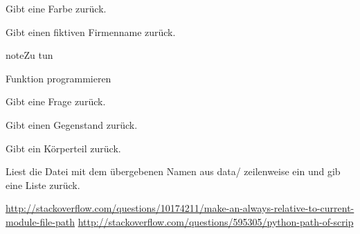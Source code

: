 \documentclass[a4paper,12pt,oneside]{sphinxmanual}
\begin{document}

\begin{fulllineitems}
\label{funktionen:pyzufall.farbe}
Gibt eine Farbe zurück.

\end{fulllineitems}


\begin{fulllineitems}
\label{funktionen:pyzufall.firma}
Gibt einen fiktiven Firmenname zurück.

\begin{notice}{note}{Zu tun}

Funktion programmieren
\end{notice}

\end{fulllineitems}


\begin{fulllineitems}
\label{funktionen:pyzufall.frage}
Gibt eine Frage zurück.

\end{fulllineitems}


\begin{fulllineitems}
\label{funktionen:pyzufall.gegenstand}
Gibt einen Gegenstand zurück.

\end{fulllineitems}


\begin{fulllineitems}
\label{funktionen:pyzufall.koerperteil}
Gibt ein Körperteil zurück.

\end{fulllineitems}


\begin{fulllineitems}
\label{funktionen:pyzufall.lese}
Liest die Datei mit dem übergebenen Namen aus data/ zeilenweise ein und gib eine Liste zurück.

\href{http://stackoverflow.com/questions/10174211/make-an-always-relative-to-current-module-file-path}{http://stackoverflow.com/questions/10174211/make-an-always-relative-to-current-module-file-path}
\href{http://stackoverflow.com/questions/595305/python-path-of-scrip}{http://stackoverflow.com/questions/595305/python-path-of-scrip}

\end{fulllineitems}
\end{document}
